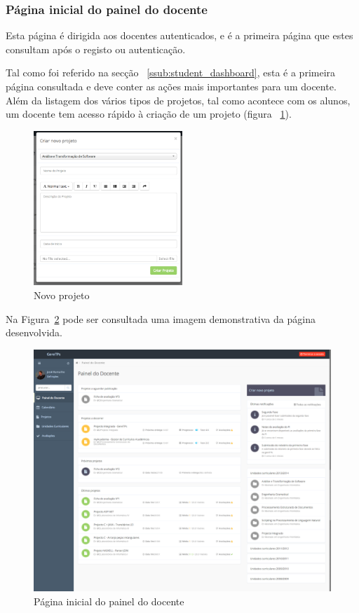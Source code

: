 \subsubsection{Página inicial do painel do docente}
\label{ssub:teacher_dashboard}

Esta página é dirigida aos docentes autenticados, e é a primeira página que estes consultam após o registo ou autenticação.

Tal como foi referido na secção ~\ref{ssub:student_dashboard}, esta é a primeira página consultada e deve conter as ações mais importantes para um docente.
Além da listagem dos vários tipos de projetos, tal como acontece com os alunos, um docente tem acesso rápido à criação de um projeto (figura ~\ref{fig:teacher_project_new}).

\begin{figure}[H]
  \centering
  \includegraphics[width=0.5\textwidth,center]{images/implementacao/docentes/new_project}
  \caption{Novo projeto}
  \label{fig:teacher_project_new}
\end{figure}


Na Figura~\ref{fig:teacher_dashboard} pode ser consultada uma imagem demonstrativa da página desenvolvida.

\begin{figure}[H]
  \centering
  \includegraphics[width=1\textwidth,center]{images/implementacao/docentes/dashboard}
  \caption{Página inicial do painel do docente}
  \label{fig:teacher_dashboard}
\end{figure}
